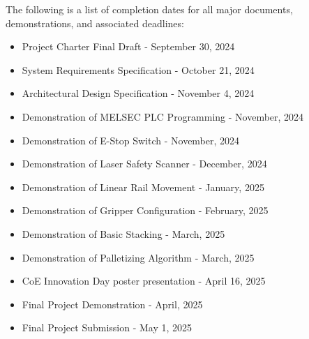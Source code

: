 The following is a list of completion dates for all major documents, demonstrations, and associated deadlines:
\begin{itemize}
  \item Project Charter Final Draft             - September 30, 2024
  \item System Requirements Specification       - October   21, 2024
  \item Architectural Design Specification      - November   4, 2024
  \item Demonstration of MELSEC PLC Programming - November,     2024
  \item Demonstration of E-Stop Switch          - November,     2024
  \item Demonstration of Laser Safety Scanner   - December,     2024
  \item Demonstration of Linear Rail Movement   - January,      2025
  \item Demonstration of Gripper Configuration  - February,     2025
  \item Demonstration of Basic Stacking         - March,        2025
  \item Demonstration of Palletizing Algorithm  - March,        2025
  \item CoE Innovation Day poster presentation  - April     16, 2025
  \item Final Project Demonstration             - April,        2025    
  \item Final Project Submission                - May        1, 2025
\end{itemize}

